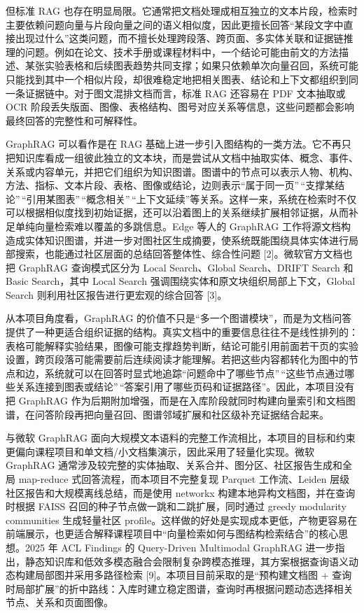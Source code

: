 但标准 RAG
也存在明显局限。它通常把文档处理成相互独立的文本片段，检索时主要依赖问题向量与片段向量之间的语义相似度，因此更擅长回答``某段文字中直接出现过什么''这类问题，而不擅长处理跨段落、跨页面、多实体关联和证据链推理的问题。例如在论文、技术手册或课程材料中，一个结论可能由前文的方法描述、某张实验表格和后续图表趋势共同支撑；如果只依赖单次向量召回，系统可能只能找到其中一个相似片段，却很难稳定地把相关图表、结论和上下文都组织到同一条证据链中。对于图文混排文档而言，标准
RAG 还容易在 PDF 文本抽取或 OCR
阶段丢失版面、图像、表格结构、图号对应关系等信息，这些问题都会影响最终回答的完整性和可解释性。

GraphRAG 可以看作是在 RAG
基础上进一步引入图结构的一类方法。它不再只把知识库看成一组彼此独立的文本块，而是尝试从文档中抽取实体、概念、事件、关系或内容单元，并把它们组织为知识图谱。图谱中的节点可以表示人物、机构、方法、指标、文本片段、表格、图像或结论，边则表示``属于同一页''\,``支撑某结论''\,``引用某图表''\,``概念相关''\,``上下文延续''等关系。这样一来，系统在检索时不仅可以根据相似度找到初始证据，还可以沿着图上的关系继续扩展相邻证据，从而补足单纯向量检索难以覆盖的多跳信息。Edge
等人的 GraphRAG
工作将源文档构造成实体知识图谱，并进一步对图社区生成摘要，使系统既能围绕具体实体进行局部搜索，也能通过社区层面的总结回答整体性、综合性问题
{[}2{]}。微软官方文档也把 GraphRAG 查询模式区分为 Local Search、Global
Search、DRIFT Search 和 Basic Search，其中 Local Search
强调围绕实体和原文块组织局部上下文，Global Search
则利用社区报告进行更宏观的综合回答 {[}3{]}。

从本项目角度看，GraphRAG
的价值不只是``多一个图谱模块''，而是为文档问答提供了一种更适合组织证据的结构。真实文档中的重要信息往往不是线性排列的：表格可能解释实验结果，图像可能支撑趋势判断，结论可能引用前面若干页的实验设置，跨页段落可能需要前后连续阅读才能理解。若把这些内容都转化为图中的节点和边，系统就可以在回答时显式地追踪``问题命中了哪些节点''\,``这些节点通过哪些关系连接到图表或结论''\,``答案引用了哪些页码和证据路径''。因此，本项目没有把
GraphRAG
作为后期附加增强，而是在入库阶段就同时构建向量索引和文档图谱，在问答阶段再把向量召回、图谱邻域扩展和社区级补充证据结合起来。

与微软 GraphRAG
面向大规模文本语料的完整工作流相比，本项目的目标和约束更偏向课程项目和单文档/小文档集演示，因此采用了轻量化实现。微软
GraphRAG 通常涉及较完整的实体抽取、关系合并、图分区、社区报告生成和全局
map-reduce 式回答流程，而本项目不完整复现 Parquet 工作流、Leiden
层级社区报告和大规模离线总结，而是使用 networkx
构建本地异构文档图，并在查询时根据 FAISS
召回的种子节点做一跳和二跳扩展，同时通过 greedy modularity communities
生成轻量社区
profile。这样做的好处是实现成本更低，产物更容易在前端展示，也更适合解释课程项目中``向量检索如何与图结构检索结合''的核心思想。2025
年 ACL Findings 的 Query-Driven Multimodal GraphRAG
进一步指出，静态知识库和低效多模态融合会限制复杂跨模态推理，其方案根据查询语义动态构建局部图并采用多路径检索
{[}9{]}。本项目目前采取的是``预构建文档图 +
查询时局部扩展''的折中路线：入库时建立稳定图谱，查询时再根据问题动态选择相关节点、关系和页面图像。

